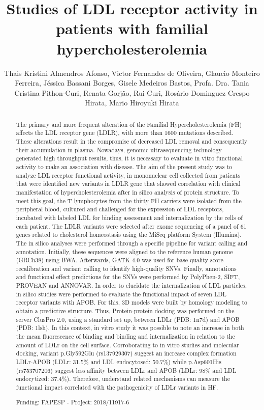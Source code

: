 \documentclass[twoside]{article}
\title{\vspace{-15mm}\fontsize{24pt}{10pt}\selectfont\textbf{ Studies of LDL receptor activity in patients with familial hypercholesterolemia }} %
\author{ Thais Kristini Almendros Afonso, Victor Fernandes de Oliveira, Glaucio Monteiro Ferreira, J\'essica Bassani Borges, Gisele Medeiros Bastos, Profa. Dra. Tania Cristina Pithon-Curi, Renata Gorj\~ao, Rui Curi, Ros\'ario Dominguez Crespo Hirata, Mario Hiroyuki Hirata }
\affil{ Laboratory of Molecular Research in Cardiology (LIMC),  Dante Pazzanese Institute of Cardiology,  S\~ao Paulo,  Brazil }
\date{}
\begin{document}
  
  
  \maketitle %
  
  
  \thispagestyle{fancy} %
  
  
  \begin{abstract}
  The primary and more frequent alteration of the Familial Hypercholesterolemia (FH) affects the LDL receptor gene (LDLR),  with more than 1600 mutations described. These alterations result in the compromise of decreased LDL removal and consequently their accumulation in plasma. Nowadays,  genomic ultrasequencing technology generated high throughput results,  thus,  it is necessary to evaluate in vitro functional activity to make an association with disease. The aim of the present study was to analyze LDL receptor functional activity,  in mononuclear cell collected from patients that were identified new variants in LDLR gene that showed correlation with clinical manifestation of hypercholesterolemia after in silico analysis of protein structure. To meet this goal,  the T lymphocytes from the thirty FH carriers were isolated from the peripheral blood,  cultured and challenged for the expression of LDL receptors,  incubated with labeled LDL for binding assessment and internalization by the cells of each patient. The LDLR variants were selected after exome sequencing of a panel of 61 genes related to cholesterol homeostasis using the MiSeq platform System (Illumina). The in silico analyses were performed through a specific pipeline for variant calling and annotation. Initially,  these sequences were aligned to the reference human genome (GRCh38) using BWA. Afterwards,  GATK 4.0 was used for base quality score recalibration and variant calling to identify high-quality SNVs. Finally,  annotations and functional effect predictions for the SNVs were performed by PolyPhen-2,  SIFT,  PROVEAN and ANNOVAR. In order to elucidate the internalization of LDL particles,  in silico studies were performed to evaluate the functional impact of seven LDL receptor variants with APOB. For this,  3D models were built by homology modeling to obtain a predictive structure. Thus,  Protein-protein docking was performed on the server ClusPro 2.0,  using a standard set up,  between LDLr (PDB: 1n7d) and APOB (PDB: 1lsh). In this context,  in vitro study it was possible to note an increase in both the mean fluorescence of binding and binding and internalization in relation to the amount of LDLr on the cell surface. Corroborating to in vitro studies and molecular docking,  variant p.Gly592Glu (rs137929307) suggest an increase complex formation LDLr-APOB (LDLr: 31.5\% and LDL endocytosed: 50.7\%) while p.Asp601His (rs753707206) suggest less affinity between LDLr and APOB (LDLr: 98\% and LDL endocytized: 37.4\%). Therefore,  understand related mechanisms can measure the functional impact correlated with the pathogenicity of LDLr variants in HF.
  
  Funding: FAPESP - Project: 2018/11917-6 \\ 
  \end{abstract}
  
\end{document}
